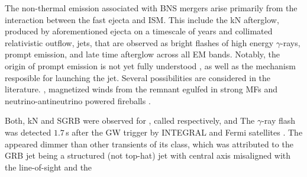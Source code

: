 The non-thermal emission associated with \ac{BNS} mergers arise primarily from the
interaction between the fast ejecta and \ac{ISM}\cite{23,Piran:2012wd}. This include the 
\ac{kN} afterglow,
produced by aforementioned ejecta on a timescale of years and collimated 
relativistic outflow, jets, that are observed as bright flashes of high energy $\gamma$-rays, 
prompt emission, and late time afterglow across all \ac{EM} bands. \cite{82,125} 
Notably, the origin of prompt emission is not yet fully understood \cite{Kumar:2014upa},
as well as the mechanism resposible for launching the jet. Several possibilities are 
considered in the literature.  \cite{126,76}, magnetized winds 
from the remnant egulfed in strong \acp{MF} \cite{109,75} and neutrino-antineutrino powered 
fireballs \cite{82}.

Both, \ac{kN} and \ac{SGRB} were observed for \GW{}, called respectively, \AT{} and \GRB{} 
\cite{kilonova observation list}
\cite{grb observation list}
The $\gamma$-ray flash was detected $1.7\,$s after the \ac{GW} trigger by INTEGRAL and 
Fermi satellites \cite{127}. The \GRB{} appeared dimmer than other transients of its class, 
which was attributed to the \ac{GRB} jet being a structured (not top-hat) jet with central axis
misaligned with the line-of-sight and the 
\cite{128,129}\cite{Refs of a struct jet model}



